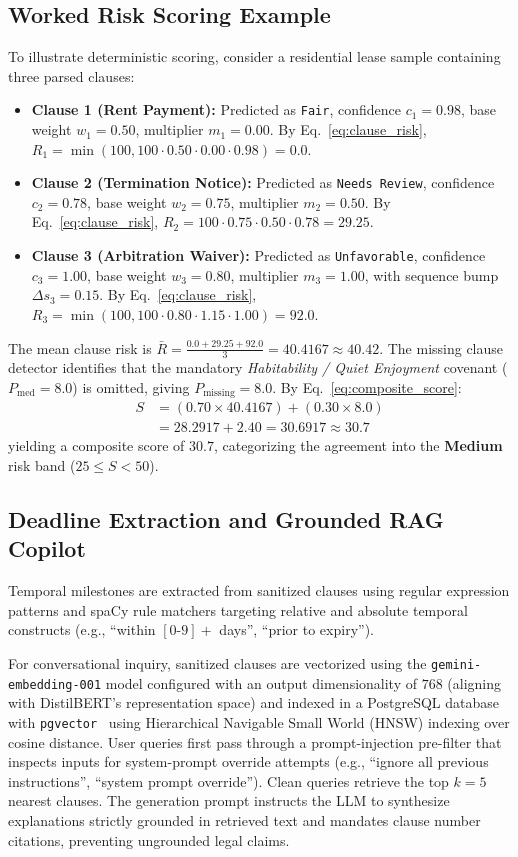 \documentclass[conference]{IEEEtran}
\begin{document}
\subsection{Worked Risk Scoring Example}
To illustrate deterministic scoring, consider a residential lease sample containing three parsed clauses:
\begin{itemize}
    \item \textbf{Clause 1 (Rent Payment):} Predicted as \texttt{Fair}, confidence $c_1 = 0.98$, base weight $w_1 = 0.50$, multiplier $m_1 = 0.00$. By Eq.~\eqref{eq:clause_risk}, $R_1 = \min(100, 100 \cdot 0.50 \cdot 0.00 \cdot 0.98) = 0.0$.
    \item \textbf{Clause 2 (Termination Notice):} Predicted as \texttt{Needs Review}, confidence $c_2 = 0.78$, base weight $w_2 = 0.75$, multiplier $m_2 = 0.50$. By Eq.~\eqref{eq:clause_risk}, $R_2 = 100 \cdot 0.75 \cdot 0.50 \cdot 0.78 = 29.25$.
    \item \textbf{Clause 3 (Arbitration Waiver):} Predicted as \texttt{Unfavorable}, confidence $c_3 = 1.00$, base weight $w_3 = 0.80$, multiplier $m_3 = 1.00$, with sequence bump $\Delta s_3 = 0.15$. By Eq.~\eqref{eq:clause_risk}, $R_3 = \min(100, 100 \cdot 0.80 \cdot 1.15 \cdot 1.00) = 92.0$.
\end{itemize}
The mean clause risk is $\bar{R} = \frac{0.0 + 29.25 + 92.0}{3} = 40.4167 \approx 40.42$. The missing clause detector identifies that the mandatory \textit{Habitability / Quiet Enjoyment} covenant ($P_{\text{med}} = 8.0$) is omitted, giving $P_{\text{missing}} = 8.0$. By Eq.~\eqref{eq:composite_score}:
\begin{align*}
S &= (0.70 \times 40.4167) + (0.30 \times 8.0) \\
  &= 28.2917 + 2.40 = 30.6917 \approx 30.7
\end{align*}
yielding a composite score of $30.7$, categorizing the agreement into the \textbf{Medium} risk band ($25 \le S < 50$).

\subsection{Deadline Extraction and Grounded RAG Copilot}
Temporal milestones are extracted from sanitized clauses using regular expression patterns and spaCy rule matchers targeting relative and absolute temporal constructs (e.g., ``within $[0\text{-}9]+$ days'', ``prior to expiry'').

For conversational inquiry, sanitized clauses are vectorized using the \texttt{gemini-embedding-001} model configured with an output dimensionality of $768$ (aligning with DistilBERT's representation space) and indexed in a PostgreSQL database with \texttt{pgvector}~\cite{pgvector2023} using Hierarchical Navigable Small World (HNSW) indexing over cosine distance. User queries first pass through a prompt-injection pre-filter that inspects inputs for system-prompt override attempts (e.g., ``ignore all previous instructions'', ``system prompt override''). Clean queries retrieve the top $k=5$ nearest clauses. The generation prompt instructs the LLM to synthesize explanations strictly grounded in retrieved text and mandates clause number citations, preventing ungrounded legal claims.
\end{document}
